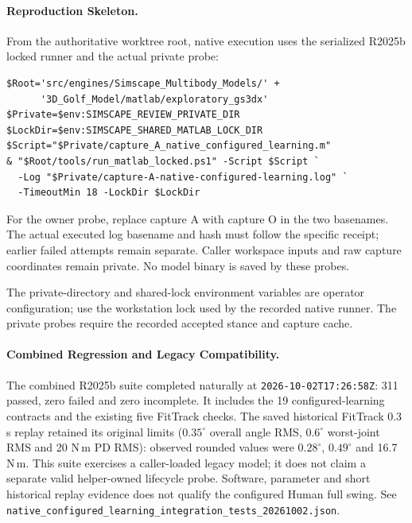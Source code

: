 \documentclass[11pt,a4paper]{article}
\begin{document}
\paragraph{Reproduction Skeleton.}
From the authoritative worktree root, native execution uses the serialized
R2025b locked runner and the actual private probe:
\begin{verbatim}
$Root='src/engines/Simscape_Multibody_Models/' +
      '3D_Golf_Model/matlab/exploratory_gs3dx'
$Private=$env:SIMSCAPE_REVIEW_PRIVATE_DIR
$LockDir=$env:SIMSCAPE_SHARED_MATLAB_LOCK_DIR
$Script="$Private/capture_A_native_configured_learning.m"
& "$Root/tools/run_matlab_locked.ps1" -Script $Script `
  -Log "$Private/capture-A-native-configured-learning.log" `
  -TimeoutMin 18 -LockDir $LockDir
\end{verbatim}
For the owner probe, replace capture A with capture O in the two basenames.
The actual executed log basename and hash must follow the specific receipt;
earlier failed attempts remain separate. Caller workspace inputs and raw
capture coordinates remain private. No model binary is saved by these probes.

The private-directory and shared-lock environment variables are operator
configuration; use the workstation lock used by the recorded native runner.
The private probes require the recorded accepted stance and capture cache.


\paragraph{Combined Regression and Legacy Compatibility.}
The combined R2025b suite completed naturally at
\texttt{2026-10-02T17:26:58Z}: 311 passed, zero failed and zero incomplete.
It includes the 19 configured-learning contracts and the existing five
FitTrack checks. The saved historical FitTrack 0.3 s replay retained its
original limits ($0.35^\circ$ overall angle RMS, $0.6^\circ$ worst-joint RMS
and 20 N\,m PD RMS): observed rounded values were $0.28^\circ$, $0.49^\circ$
and 16.7 N\,m. This suite exercises a caller-loaded legacy model; it does
not claim a separate valid helper-owned lifecycle probe. Software,
parameter and short historical replay evidence does not qualify the
configured Human full swing. See
\texttt{native\_configured\_learning\_integration\_tests\_20261002.json}.
\end{document}
